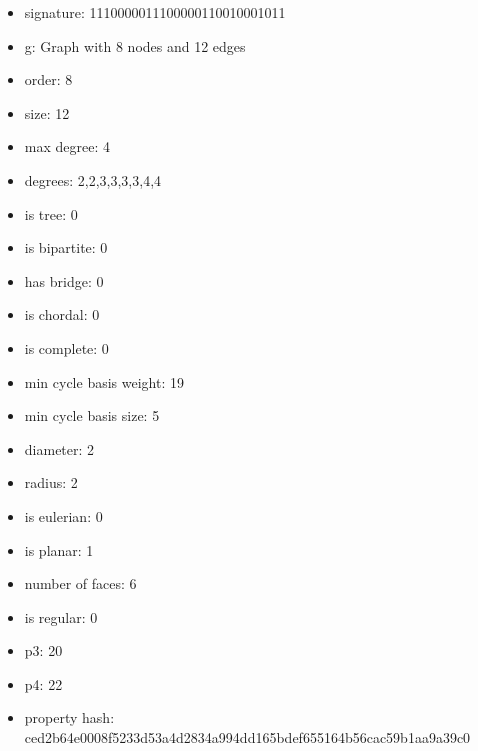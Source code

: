 \begin{itemize}
\item signature: 1110000011100000110010001011
\item g: Graph with 8 nodes and 12 edges
\item order: 8
\item size: 12
\item max degree: 4
\item degrees: 2,2,3,3,3,3,4,4
\item is tree: 0
\item is bipartite: 0
\item has bridge: 0
\item is chordal: 0
\item is complete: 0
\item min cycle basis weight: 19
\item min cycle basis size: 5
\item diameter: 2
\item radius: 2
\item is eulerian: 0
\item is planar: 1
\item number of faces: 6
\item is regular: 0
\item p3: 20
\item p4: 22
\item property hash: ced2b64e0008f5233d53a4d2834a994dd165bdef655164b56cac59b1aa9a39c0
\end{itemize}
\newpage
\begin{figure}
\end{figure}
